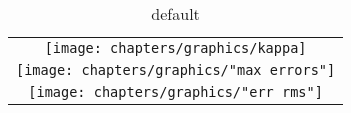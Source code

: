 \begin{table}[htdp]
\caption{default}
\begin{center}
\begin{tabular}{c}
%
\texttt{[image: chapters/graphics/kappa]} \\
%
\texttt{[image: chapters/graphics/"max errors"]} \\
%
\texttt{[image: chapters/graphics/"err rms"]} \\
%
\end{tabular}
\end{center}
\label{default}
\end{table}%

\endinput %